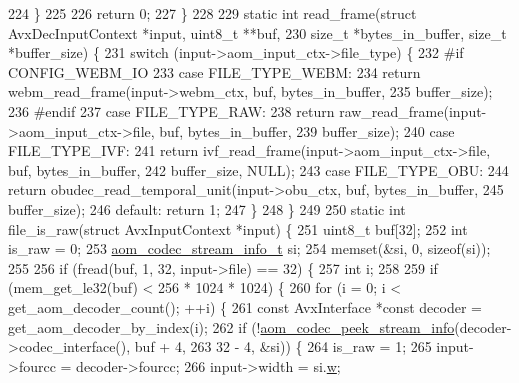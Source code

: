 \begin{DoxyCodeInclude}
{{{{{{{224   \}
225 
226   \textcolor{keywordflow}{return} 0;
227 \}
228 
229 \textcolor{keyword}{static} \textcolor{keywordtype}{int} read\_frame(\textcolor{keyword}{struct} AvxDecInputContext *input, uint8\_t **buf,
230                       \textcolor{keywordtype}{size\_t} *bytes\_in\_buffer, \textcolor{keywordtype}{size\_t} *buffer\_size) \{
231   \textcolor{keywordflow}{switch} (input->aom\_input\_ctx->file\_type) \{
232 \textcolor{preprocessor}{#if CONFIG\_WEBM\_IO}
233     \textcolor{keywordflow}{case} FILE\_TYPE\_WEBM:
234       \textcolor{keywordflow}{return} webm\_read\_frame(input->webm\_ctx, buf, bytes\_in\_buffer,
235                              buffer\_size);
236 \textcolor{preprocessor}{#endif}
237     \textcolor{keywordflow}{case} FILE\_TYPE\_RAW:
238       \textcolor{keywordflow}{return} raw\_read\_frame(input->aom\_input\_ctx->file, buf, bytes\_in\_buffer,
239                             buffer\_size);
240     \textcolor{keywordflow}{case} FILE\_TYPE\_IVF:
241       \textcolor{keywordflow}{return} ivf\_read\_frame(input->aom\_input\_ctx->file, buf, bytes\_in\_buffer,
242                             buffer\_size, NULL);
243     \textcolor{keywordflow}{case} FILE\_TYPE\_OBU:
244       \textcolor{keywordflow}{return} obudec\_read\_temporal\_unit(input->obu\_ctx, buf, bytes\_in\_buffer,
245                                        buffer\_size);
246     \textcolor{keywordflow}{default}: \textcolor{keywordflow}{return} 1;
247   \}
248 \}
249 
250 \textcolor{keyword}{static} \textcolor{keywordtype}{int} file\_is\_raw(\textcolor{keyword}{struct} AvxInputContext *input) \{
251   uint8\_t buf[32];
252   \textcolor{keywordtype}{int} is\_raw = 0;
253   \hyperlink{structaom__codec__stream__info}{aom\_codec\_stream\_info\_t} si;
254   memset(&si, 0, \textcolor{keyword}{sizeof}(si));
255 
256   \textcolor{keywordflow}{if} (fread(buf, 1, 32, input->file) == 32) \{
257     \textcolor{keywordtype}{int} i;
258 
259     \textcolor{keywordflow}{if} (mem\_get\_le32(buf) < 256 * 1024 * 1024) \{
260       \textcolor{keywordflow}{for} (i = 0; i < get\_aom\_decoder\_count(); ++i) \{
261         \textcolor{keyword}{const} AvxInterface *\textcolor{keyword}{const} decoder = get\_aom\_decoder\_by\_index(i);
262         \textcolor{keywordflow}{if} (!\hyperlink{group__decoder_ga2544bac9fdc439f0effd6b1b14df54be}{aom\_codec\_peek\_stream\_info}(decoder->codec\_interface(), buf + 4,
263                                         32 - 4, &si)) \{
264           is\_raw = 1;
265           input->fourcc = decoder->fourcc;
266           input->width = si.\hyperlink{structaom__codec__stream__info_add84a2752fefd706f893fbc41ba6b9f2}{w};
}}}}}}}
\end{DoxyCodeInclude}

